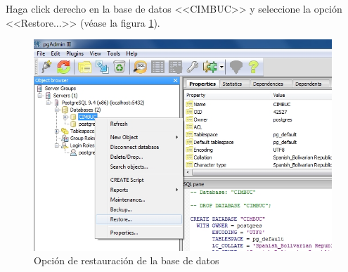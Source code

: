 Haga click derecho en la base de datos <<CIMBUC>> y seleccione la opci\'{o}n <<Restore...>> (v\'{e}ase la figura \ref{fig:pgadmin-restaurar}).
\vfill
\begin{figure}[H]
  \centering
  \includegraphics[width=1\linewidth]{./img/pgadmin-restaurar.jpg}
\caption[]{Opci\'{o}n de restauraci\'{o}n de la base de datos\label{fig:pgadmin-restaurar}}
\end{figure}
\vfill
\newpage

